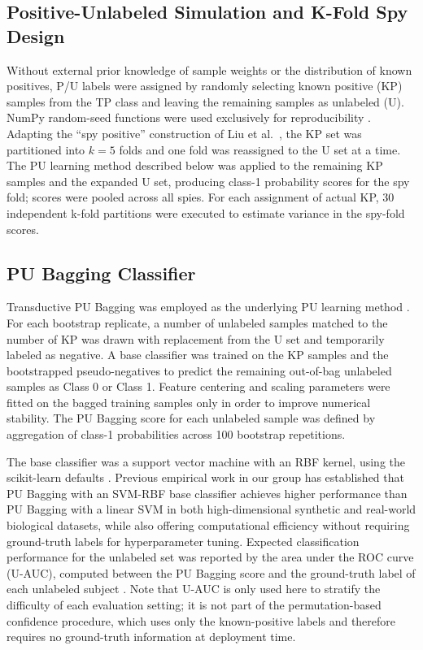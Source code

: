 \documentclass[11pt]{article}
\begin{document}
\subsection{Positive-Unlabeled Simulation and K-Fold Spy Design}

Without external prior knowledge of sample weights or the distribution of known positives, P/U labels were assigned by randomly selecting known positive (KP) samples from the TP class and leaving the remaining samples as unlabeled (U). NumPy random-seed functions were used exclusively for reproducibility \cite{harris2020numpy}. Adapting the ``spy positive'' construction of Liu et al.\ \cite{liu2003spy}, the KP set was partitioned into $k = 5$ folds and one fold was reassigned to the U set at a time. The PU learning method described below was applied to the remaining KP samples and the expanded U set, producing class-1 probability scores for the spy fold; scores were pooled across all spies. For each assignment of actual KP, 30 independent k-fold partitions were executed to estimate variance in the spy-fold scores.

\subsection{PU Bagging Classifier}

Transductive PU Bagging was employed as the underlying PU learning method \cite{mordelet2014bagging,breiman1996bagging}. For each bootstrap replicate, a number of unlabeled samples matched to the number of KP was drawn with replacement from the U set and temporarily labeled as negative. A base classifier was trained on the KP samples and the bootstrapped pseudo-negatives to predict the remaining out-of-bag unlabeled samples as Class 0 or Class 1. Feature centering and scaling parameters were fitted on the bagged training samples only in order to improve numerical stability. The PU Bagging score for each unlabeled sample was defined by aggregation of class-1 probabilities across 100 bootstrap repetitions.

The base classifier was a support vector machine with an RBF kernel, using the scikit-learn defaults \cite{pedregosa2011scikit}. Previous empirical work in our group has established that PU Bagging with an SVM-RBF base classifier achieves higher performance than PU Bagging with a linear SVM in both high-dimensional synthetic and real-world biological datasets, while also offering computational efficiency without requiring ground-truth labels for hyperparameter tuning. Expected classification performance for the unlabeled set was reported by the area under the ROC curve (U-AUC), computed between the PU Bagging score and the ground-truth label of each unlabeled subject \cite{hanley1982auc}. Note that U-AUC is only used here to stratify the difficulty of each evaluation setting; it is not part of the permutation-based confidence procedure, which uses only the known-positive labels and therefore requires no ground-truth information at deployment time.
\end{document}
